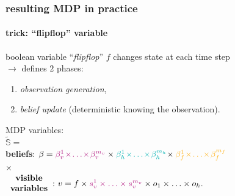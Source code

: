 \documentclass[12pt,svgnames,table]{beamer}
\begin{document}
\begin{frame}
\frametitle{resulting MDP in practice}
\framesubtitle{\footnotesize trick: ``flipflop'' variable}

\begin{block}{}
boolean variable ``\textit{flipflop}'' $f$ 
changes state at each time step\\ 
$\rightarrow$ defines $2$ phases:
\begin{enumerate}
\item \textit{observation generation}, 
\item \textit{belief update} (deterministic knowing the observation). 
\end{enumerate}
\end{block}
MDP variables:\\ 
\vspace{0.3cm}
$\tilde{\mathbb{S}} =$ \\
 \textbf{beliefs}: \hspace{-0.2cm} $\beta = { \color{violet} \beta^1_v \hspace{-0.05cm} \times \hspace{-0.05cm} \ldots \hspace{-0.05cm} \times \hspace{-0.05cm} \beta^{m_v}_v } \times  { \color{gggreen} \beta^1_h \hspace{-0.05cm} \times \hspace{-0.05cm} \ldots \hspace{-0.05cm} \times \hspace{-0.05cm} \beta^{m_h}_h } \hspace{-0.07cm} \times { \color{orangee} \beta^1_f \hspace{-0.05cm} \times \hspace{-0.05cm} \ldots \hspace{-0.05cm} \times \hspace{-0.05cm} \beta^{m_f}_f } $ \\
\vspace{0.15cm}
\hspace{2cm} $\times$ \\
$ \begin{array}{c} \mbox{\textbf{visible}} \\ \mbox{\textbf{variables}} \end{array} $: $v = f \times { \color{violet} s^1_v \times \ldots \times s^{m_v}_v } \times o_1 \times \ldots \times o_{k} $.
\end{frame}
\end{document}
